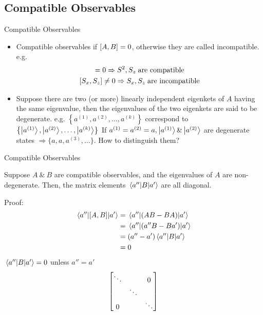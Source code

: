 \subsection{Compatible Observables}
\begin{frame}{Compatible Observables}
	\begin{itemize}
		\item Compatible observables if $\comm{A}{B} = 0$, otherwise they are called incompatible. e.g.
		      \begin{gather*}
			      [S^2,S_z] = 0 \Rightarrow S^2,S_z \; \text{are compatible}\\
			      \comm{S_x}{S_z} \neq 0 \Rightarrow S_x,S_z \; \text{are incompatible}
		      \end{gather*}
		\item Suppose there are two (or more) linearly independent eigenkets of $A$ having the same eigenvalue, then the eigenvalues of the two eigenkets are said to be degenerate. e.g. $\left\{ a^{(1)}, a^{(2)},\dots,a^{(k)}\right\}$ correspond to $\left\{\ket{a^{(1)}},\ket{a^{(2)}},\dots,\ket{a^{(k)}}	\right\}$
		      If $a^{(1)} = a^{(2)} = a, \ket{a^{(1)}} \& \ket{a^{(2)}}$ are degenerate states $\Rightarrow \{a,a,a^{(3)} ,\dots\}$. How to distinguish them?
	\end{itemize}
\end{frame}

\begin{frame}{Compatible Observables}
	\begin{theorem}[2]
		Suppose $A \ \&\  B$ are compatible observables, and the eigenvalues of $A$ are non-degenerate. Then, the matrix elements $\mel{a''}{B}{a'}$ are all diagonal.
	\end{theorem}

	Proof:
	\begin{align*}
		\mel{a''}{\comm{A}{B}}{a'} & = \mel{a''}{(AB - BA)}{a'}    \\
		                           & = \mel{a''}{(a''B -B a')}{a'} \\
		                           & = (a'' - a') \mel{a''}{B}{a'} \\
		                           & = 0
	\end{align*}
	$\mel{a''}{B}{a'} = 0 $ unless $a'' = a'$
	\[
		\mqty[\ddots\admat{0,\ddots,0}\ddots]
	\]
\end{frame}

